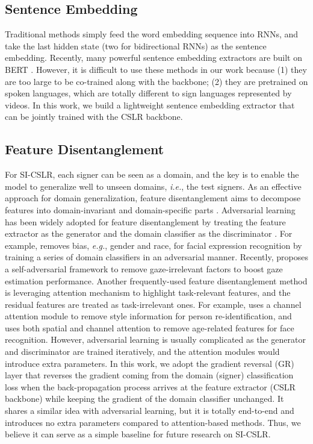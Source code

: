 \documentclass[acmsmall,screen]{acmart}
\def\eg{\emph{e.g.}} \def\Eg{\emph{E.g.}}
\def\ie{\emph{i.e.}} \def\Ie{\emph{I.e.}}
\begin{document}
\subsection{Sentence Embedding}
Traditional methods \cite{palangi2016deep, liu2019cross} simply feed the word embedding sequence into RNNs, and take the last hidden state (two for bidirectional RNNs) as the sentence embedding. 
Recently, many powerful sentence embedding extractors \cite{reimers2019sentence, gao2021simcse, carlsson2020semantic} are built on BERT \cite{kenton2019bert}.
However, it is difficult to use these methods in our work because (1) they are too large to be co-trained along with the backbone; (2) they are pretrained on spoken languages, which are totally different to sign languages represented by videos.
In this work, we build a lightweight sentence embedding extractor that can be jointly trained with the CSLR backbone.

\subsection{Feature Disentanglement}
\label{sec:disent}
For SI-CSLR, each signer can be seen as a domain, and the key is to enable the model to generalize well to unseen domains, \ie, the test signers.
As an effective approach for domain generalization, feature disentanglement aims to decompose features into domain-invariant and domain-specific parts \cite{wang2021generalizing}.
Adversarial learning has been widely adopted for feature disentanglement by treating the feature extractor as the generator and the domain classifier as the discriminator \cite{xu2020investigating, cheng2021puregaze, liu2018exploring}.
For example, \cite{xu2020investigating} removes bias, \eg, gender and race, for facial expression recognition by training a series of domain classifiers in an adversarial manner.
Recently, \cite{cheng2021puregaze} proposes a self-adversarial framework to remove gaze-irrelevant factors to boost gaze estimation performance.
Another frequently-used feature disentanglement method is leveraging attention mechanism to highlight task-relevant features, and the residual features are treated as task-irrelevant ones.
For example, \cite{jin2020style} uses a channel attention module to remove style information for person re-identification, and \cite{huang2021age} uses both spatial and channel attention to remove age-related features for face recognition.
However, adversarial learning is usually complicated as the generator and discriminator are trained iteratively, and the attention modules would introduce extra parameters.
In this work, we adopt the gradient reversal (GR) layer \cite{ganin2016domain} that reverses the gradient coming from the domain (signer) classification loss when the back-propagation process arrives at the feature extractor (CSLR backbone) while keeping the gradient of the domain classifier unchanged.
It shares a similar idea with adversarial learning, but it is totally end-to-end and introduces no extra parameters compared to attention-based methods.
Thus, we believe it can serve as a simple baseline for future research on SI-CSLR.
\end{document}
